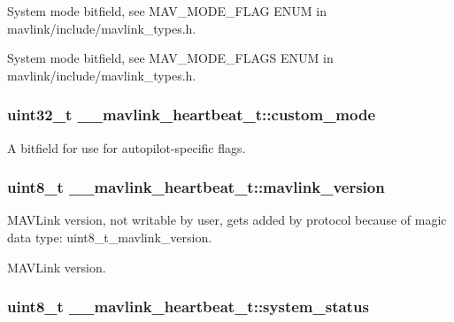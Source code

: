 System mode bitfield, see M\+A\+V\+\_\+\+M\+O\+D\+E\+\_\+\+F\+L\+A\+G E\+N\+U\+M in mavlink/include/mavlink\+\_\+types.\+h. 

System mode bitfield, see M\+A\+V\+\_\+\+M\+O\+D\+E\+\_\+\+F\+L\+A\+G\+S E\+N\+U\+M in mavlink/include/mavlink\+\_\+types.\+h. \hypertarget{struct____mavlink__heartbeat__t_a4d8e5d4a59f775887eaecfd58303e17d}{
\subsubsection[{custom\+\_\+mode}]{\setlength{\rightskip}{0pt plus 5cm}uint32\+\_\+t \+\_\+\+\_\+mavlink\+\_\+heartbeat\+\_\+t\+::custom\+\_\+mode}}\label{struct____mavlink__heartbeat__t_a4d8e5d4a59f775887eaecfd58303e17d}


A bitfield for use for autopilot-\/specific flags. 

\hypertarget{struct____mavlink__heartbeat__t_a235d5b6a09fa9b24b3ef7b7a28d15b97}{
\subsubsection[{mavlink\+\_\+version}]{\setlength{\rightskip}{0pt plus 5cm}uint8\+\_\+t \+\_\+\+\_\+mavlink\+\_\+heartbeat\+\_\+t\+::mavlink\+\_\+version}}\label{struct____mavlink__heartbeat__t_a235d5b6a09fa9b24b3ef7b7a28d15b97}


M\+A\+V\+Link version, not writable by user, gets added by protocol because of magic data type\+: uint8\+\_\+t\+\_\+mavlink\+\_\+version. 

M\+A\+V\+Link version. \hypertarget{struct____mavlink__heartbeat__t_a914b772577c4898cc5bfe4ece1c8529d}{
\subsubsection[{system\+\_\+status}]{\setlength{\rightskip}{0pt plus 5cm}uint8\+\_\+t \+\_\+\+\_\+mavlink\+\_\+heartbeat\+\_\+t\+::system\+\_\+status}}\label{struct____mavlink__heartbeat__t_a914b772577c4898cc5bfe4ece1c8529d}


